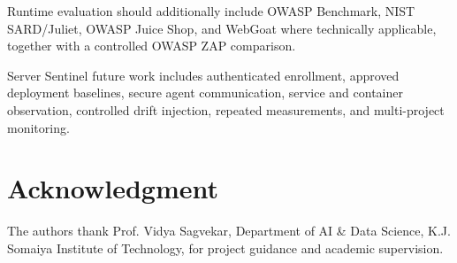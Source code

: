 \documentclass[journal]{IEEEtran}
\begin{document}
Runtime evaluation should additionally include OWASP Benchmark, NIST
SARD/Juliet, OWASP Juice Shop, and WebGoat where technically applicable,
together with a controlled OWASP ZAP comparison.

Server Sentinel future work includes authenticated enrollment, approved
deployment baselines, secure agent communication, service and container
observation, controlled drift injection, repeated measurements, and
multi-project monitoring.

\section*{Acknowledgment}

The authors thank Prof. Vidya Sagvekar, Department of AI \& Data Science,
K.J. Somaiya Institute of Technology, for project guidance and academic
supervision.
\end{document}
